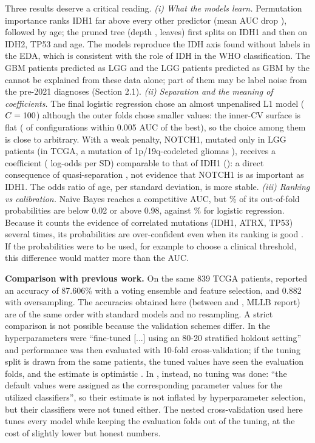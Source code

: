 Three results deserve a critical reading.
\emph{(i) What the models learn.} Permutation importance ranks IDH1 far above every other predictor
(mean AUC drop \ClfPermIDH{}), followed by age; the pruned tree (depth \ClfTreeDepth, \ClfTreeLeaves{}
leaves) first splits on IDH1 and then on IDH2, TP53 and age. The models reproduce the IDH axis found
without labels in the EDA, which is consistent with the role of IDH in the WHO classification. The
\ClfFN{} GBM patients predicted as LGG and the \ClfFP{} LGG patients predicted as GBM by the
\ClfBest{} cannot be explained from these data alone; part of them may be label noise from the
pre-2021 diagnoses (Section 2.1).
\emph{(ii) Separation and the meaning of coefficients.} The final logistic regression chose an
almost unpenalised L1 model ($C = 100$) although the outer folds chose smaller values: the
inner-CV surface is flat (\LRFlatWithin{} of \LRFlatTotal{} configurations within 0.005 AUC of the
best), so the choice among them is close to arbitrary. With a weak penalty, NOTCH1, mutated only in
LGG patients (in TCGA, a mutation of 1p/19q-codeleted gliomas \cite{tcga2015lgg}), receives a coefficient (\LRCoefNOTCH{} log-odds per SD) comparable to that of IDH1
(\LRCoefIDH): a direct consequence of quasi-separation \cite{albert1984}, not evidence that NOTCH1 is
as important as IDH1. The odds ratio of age, \LRORAge{} per standard deviation, is more stable.
\emph{(iii) Ranking vs calibration.} Naive Bayes reaches a competitive AUC, but \NBExtreme\% of its
out-of-fold probabilities are below 0.02 or above 0.98, against \LRExtreme\% for logistic regression.
Because it counts the evidence of correlated mutations (IDH1, ATRX, TP53) several times, its
probabilities are over-confident even when its ranking is good \cite{hand2001}. If the probabilities
were to be used, for example to choose a clinical threshold, this difference would matter more than
the AUC.

\textbf{Comparison with previous work.} On the same 839 TCGA patients, \cite{tasci2022} reported an
accuracy of 87.606\% with a voting ensemble and feature selection, and \cite{sanchezmarques2024}
0.882 with oversampling. The accuracies obtained here (between \ClfMinAcc{} and \ClfMaxAcc, MLLB report) are of the same order with standard models and no resampling. A strict comparison is not
possible because the validation schemes differ. In \cite{sanchezmarques2024} the hyperparameters were
``fine-tuned [...] using an 80-20 stratified holdout setting'' and performance was then evaluated with
10-fold cross-validation; if the tuning split is drawn from the same patients, the tuned values have
seen the evaluation folds, and the estimate is optimistic \cite{varma2006,cawley2010}.
In \cite{tasci2022}, instead, no tuning was done: ``the default values were assigned as the
corresponding parameter values for the utilized classifiers'', so their estimate is not inflated by
hyperparameter selection, but their classifiers were not tuned either. The nested cross-validation
used here tunes every model while keeping the evaluation folds out of the tuning, at the cost of
slightly lower but honest numbers.

